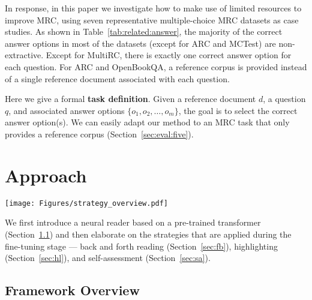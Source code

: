 \documentclass[11pt,a4paper]{article}
\begin{document}
In response, in this paper we investigate how to make use of limited resources to improve MRC, using seven representative multiple-choice MRC datasets as case studies. As shown in Table~\ref{tab:related:answer}, the majority of the correct answer options in most of the datasets (except for ARC and MCTest) are non-extractive. Except for MultiRC, there is exactly one correct answer option for each question. For ARC and OpenBookQA, a reference corpus is provided instead of a single reference document associated with each question.

Here we give a formal \textbf{task definition}. Given a reference document $d$, a question $q$, and associated answer options $\{o_1, o_2, \dots, o_m\}$, the goal is to select the correct answer option(s). We can easily adapt our method to an MRC task that only provides a reference corpus (Section~\ref{sec:eval:five}).









 \section{Approach}
\label{sec:method}

\begin{figure*}[htbp!]
   \begin{center}
   \texttt{[image: Figures/strategy\_overview.pdf]}
   \end{center}
\caption{Framework Overview. Strategy 1, 2, and 3 refer to back and forth reading (BF) (Section~\ref{sec:fb}), highlighting (HL) (Section~\ref{sec:hl}), and self-assessment (SA) (Section~\ref{sec:sa}), respectively.}
 \label{fig:overview}
\end{figure*}


We first introduce a neural reader based on a pre-trained transformer (Section~\ref{sec:trans}) and then elaborate on the strategies that are applied during the fine-tuning stage ---  back and forth reading (Section~\ref{sec:fb}), highlighting (Section~\ref{sec:hl}), and self-assessment (Section~\ref{sec:sa}). 




\subsection{Framework Overview}
\label{sec:trans}
\end{document}
